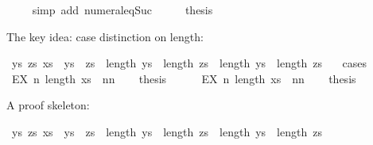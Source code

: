 \begin{isabellebody}
\ \ \ \ \isamarkupfalse%
{\isacharparenleft}{\kern0pt}simp\ add{\isacharcolon}{\kern0pt}\ numeral{\isacharunderscore}{\kern0pt}eq{\isacharunderscore}{\kern0pt}Suc{\isacharparenright}{\kern0pt}\isanewline
\ \ \isamarkupfalse%
\ \isamarkupfalse%
\ {\isacharquery}{\kern0pt}thesis\ \isacommand{{\isachardot}{\kern0pt}}\isamarkupfalse%
\isanewline
{}\isamarkupfalse%
%
\endisatagproof
{\isafoldproof}%
%
\isadelimproof
%
\endisadelimproof
%
\isadelimdocument
%
\endisadelimdocument
%
\isatagdocument
%
\isamarkuptrue%
%
\endisatagdocument
{\isafolddocument}%
%
\isadelimdocument
%
\endisadelimdocument
%
\begin{isamarkuptext}%
The key idea: case distinction on length:%
\end{isamarkuptext}\isamarkuptrue%
\isamarkupfalse%
\ {\isachardoublequoteopen}{\isasymexists}ys\ zs{\isachardot}{\kern0pt}\ xs\ {\isacharequal}{\kern0pt}\ ys\ {\isacharat}{\kern0pt}\ zs\ {\isasymand}\ {\isacharparenleft}{\kern0pt}length\ ys\ {\isacharequal}{\kern0pt}\ length\ zs\ {\isasymor}\ length\ ys\ {\isacharequal}{\kern0pt}\ length\ zs\ {\isacharplus}{\kern0pt}\ {}{\isacharparenright}{\kern0pt}{\isachardoublequoteclose}\isanewline
%
\isadelimproof
%
\endisadelimproof
%
\isatagproof
{}\isamarkupfalse%
\ cases\isanewline
\ \ \isamarkupfalse%
\ {\isachardoublequoteopen}EX\ n{\isachardot}{\kern0pt}\ length\ xs\ {\isacharequal}{\kern0pt}\ n{\isacharplus}{\kern0pt}n{\isachardoublequoteclose}\isanewline
\ \ \isamarkupfalse%
\ {\isacharquery}{\kern0pt}thesis\ \isamarkupfalse%
\isanewline
{}\isamarkupfalse%
\isanewline
\ \ \isamarkupfalse%
\ {\isachardoublequoteopen}{\isasymnot}\ {\isacharparenleft}{\kern0pt}EX\ n{\isachardot}{\kern0pt}\ length\ xs\ {\isacharequal}{\kern0pt}\ n{\isacharplus}{\kern0pt}n{\isacharparenright}{\kern0pt}{\isachardoublequoteclose}\isanewline
\ \ \isamarkupfalse%
\ {\isacharquery}{\kern0pt}thesis\ \isamarkupfalse%
\isanewline
{}\isamarkupfalse%
%
\endisatagproof
{\isafoldproof}%
%
\isadelimproof
%
\endisadelimproof
%
\begin{isamarkuptext}%
A proof skeleton:%
\end{isamarkuptext}\isamarkuptrue%
\isamarkupfalse%
\ {\isachardoublequoteopen}{\isasymexists}ys\ zs{\isachardot}{\kern0pt}\ xs\ {\isacharequal}{\kern0pt}\ ys\ {\isacharat}{\kern0pt}\ zs\ {\isasymand}\ {\isacharparenleft}{\kern0pt}length\ ys\ {\isacharequal}{\kern0pt}\ length\ zs\ {\isasymor}\ length\ ys\ {\isacharequal}{\kern0pt}\ length\ zs\ {\isacharplus}{\kern0pt}\ {}{\isacharparenright}{\kern0pt}{\isachardoublequoteclose}\isanewline

\end{isabellebody}

